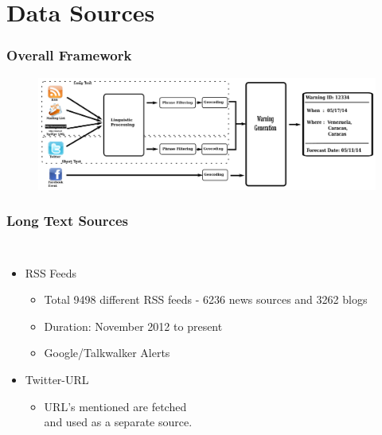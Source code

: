 \documentclass[red,handout]{beamer}
\begin{document}
\section{Data Sources}
\begin{frame}
\frametitle{Overall Framework}
\begin{figure}
    \centering
    \includegraphics[height=0.6\textheight,width=\textwidth]{pipeline}
\end{figure}
\end{frame}

\begin{frame}
\frametitle{Long Text Sources}
\begin{columns}
    \begin{itemize}
        \item<1->
            RSS Feeds
            \begin{itemize}
            \item<2->
                Total 9498 different RSS feeds - 6236 news sources and 3262 blogs
            \item<3->
                Duration: November 2012 to present
            \item<4->
                Google/Talkwalker Alerts
            \end{itemize}
        \item<5->
            Twitter-URL
            \begin{itemize}
             \item<6->
                    URL's mentioned are fetched \\
                    and used as a separate source.
            \end{itemize}
    \end{itemize}
    \begin{inparaenum}
            \vspace{.5em}
            \vspace{.5em}
    \end{inparaenum}
\end{columns}
\end{frame}
\end{document}
